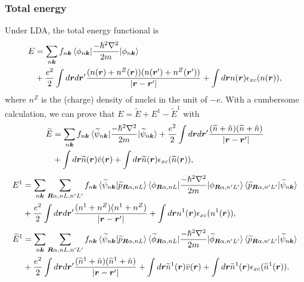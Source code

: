 \documentclass{article}
\begin{document}
\subsubsection{Total energy}
Under LDA, the total energy functional is 
\begin{align}
  E &=
  \sum_{n\bm{k}} f_{n\bm{k}} \braket{\phi_{n\bm{k}} | \frac{-\hbar^2\nabla^2}{2m} | \phi_{n\bm{k}}}
  \nonumber
  \\&+
  \frac{e^2}{2} \int d\bm{r}d\bm{r}' \frac{(n(\bm{r})+ n^Z(\bm{r})) (n(\bm{r}')+ n^Z(\bm{r}'))}{|\bm{r} - \bm{r}'|}
  + \int d\bm{r} n(\bm{r})\epsilon_{xc}(n(\bm{r})),
\end{align}
where $n^Z$ is the (charge) density of nuclei in the unit of $-e$.
With a cumbersome calculation, we can prove that $E = \widetilde{E} + E^1 - \widetilde{E}^1$ with
\begin{align} 
  \widetilde{E} &= 
  \sum_{n\bm{k}} f_{n\bm{k}} \braket{\widetilde{\psi}_{n\bm{k}} | \frac{-\hbar^2\nabla^2}{2m} |\widetilde{\psi}_{n\bm{k}} }
  + \frac{e^2}{2}\int d\bm{r}d\bm{r}' \frac{(\widetilde{n} + \hat{n})(\widetilde{n} + \hat{n})}{|\bm{r}-\bm{r}'|}
  \nonumber \\&
  + \int d\bm{r} \widetilde{n}(\bm{r})\bar{v}(\bm{r})
  + \int d\bm{r} \widetilde{n}(\bm{r})\epsilon_{xc}(\widetilde{n}(\bm{r})),
  \label{eq:tildeE}
\end{align}
\begin{align} 
  {E}^1 &= 
  \sum_{n\bm{k}} \sum_{\bm{R}\alpha, nL, n'L'}f_{n\bm{k}} 
  \braket{\widetilde{\psi}_{n\bm{k}} | \widetilde{p}_{\bm{R}\alpha, nL}}
  \braket{\phi_{\bm{R}\alpha, nL}| \frac{-\hbar^2\nabla^2}{2m} |\phi_{\bm{R}\alpha, n'L'}}
  \braket{\widetilde{p}_{\bm{R}\alpha, n'L'}|\widetilde{\psi}_{n\bm{k}} }
  \nonumber\\&
  + \frac{e^2}{2}\int d\bm{r}d\bm{r}' \frac{({n}^1 + n^Z)({n}^1 + n^Z)}{|\bm{r}-\bm{r}'|}
  + \int d\bm{r} {n}^1(\bm{r})\epsilon_{xc}({n}^1(\bm{r})),
\end{align}
\begin{align} 
  \widetilde{E}^1 &= 
  \sum_{n\bm{k}} \sum_{\bm{R}\alpha, nL, n'L'}f_{n\bm{k}} 
  \braket{\widetilde{\psi}_{n\bm{k}} | \widetilde{p}_{\bm{R}\alpha, nL}}
  \braket{\widetilde{\phi}_{\bm{R}\alpha, nL}| \frac{-\hbar^2\nabla^2}{2m} |\widetilde{\phi}_{\bm{R}\alpha, n'L'}}
  \braket{\widetilde{p}_{\bm{R}\alpha, n'L'}|\widetilde{\psi}_{n\bm{k}} }
  \nonumber\\&
  + \frac{e^2}{2}\int d\bm{r}d\bm{r}' \frac{(\widetilde{n}^1 + \hat{n})(\widetilde{n}^1 + \hat{n})}{|\bm{r}-\bm{r}'|}
  + \int d\bm{r} \widetilde{n}^1(\bm{r})\bar{v}(\bm{r})
  + \int d\bm{r} \widetilde{n}^1(\bm{r})\epsilon_{xc}(\widetilde{n}^1(\bm{r})).
\end{align}
\end{document}
